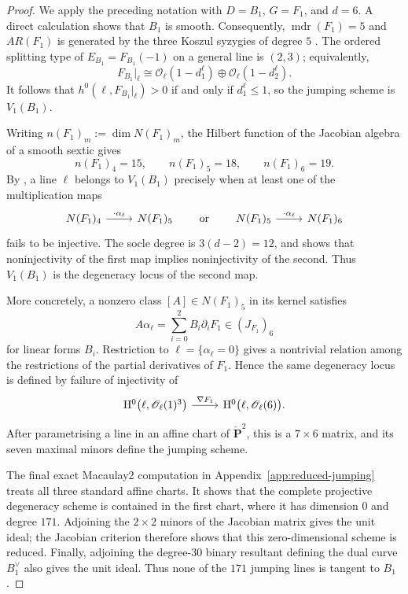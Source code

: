\documentclass[a4paper,12pt,twoside,reqno]{amsart}
\numberwithin{equation}{section}
\theoremstyle{plain}
\theoremstyle{definition}
\newcommand{\PP}{\mathbf{P}}
\newcommand{\Pdual}{\check{\PP}^2}
\newcommand{\HH}{\mathrm{H}}
\newcommand{\OO}{\mathscr{O}}
\theoremstyle{plain}
\theoremstyle{definition}
\begin{document}
\begin{proof}
We apply the preceding notation with $D=B_1$, $G=F_1$, and $d=6$.
A direct calculation shows that $B_1$ is smooth.  Consequently,
$\operatorname{mdr}(F_1)=5$ and $AR(F_1)$ is generated by the three Koszul
syzygies of degree $5$ \cite[Example~6.1]{DS}.  The ordered splitting type of
$E_{B_1}=F_{B_1}(-1)$ on a general line is $(2,3)$; equivalently,
\[
   F_{B_1}|_\ell
   \cong\OO_\ell(1-d_1^\ell)\oplus\OO_\ell(1-d_2^\ell).
\]
It follows that $h^0(\ell,F_{B_1}|_\ell)>0$ if and only if
$d_1^\ell\le1$, so the jumping scheme is $V_1(B_1)$.

Writing $n(F_1)_m:=\dim N(F_1)_m$, the Hilbert function of the Jacobian
algebra of a smooth sextic gives
\[
   n(F_1)_4=15,\qquad n(F_1)_5=18,\qquad n(F_1)_6=19.
\]
By \cite[Proposition~4.1]{DS}, a line $\ell$ belongs to $V_1(B_1)$ precisely
when at least one of the multiplication maps
\[
\begin{tikzcd}
N(F_1)_4 \arrow[r, "\cdot\alpha_\ell"] & N(F_1)_5
\end{tikzcd}
\qquad\text{or}\qquad
\begin{tikzcd}
N(F_1)_5 \arrow[r, "\cdot\alpha_\ell"] & N(F_1)_6
\end{tikzcd}
\]
fails to be injective.  The socle degree is $3(d-2)=12$, and
\cite[Remark~4.3]{DS} shows that noninjectivity of the first map implies
noninjectivity of the second.  Thus $V_1(B_1)$ is the degeneracy locus of
the second map.

More concretely, a nonzero class $[A]\in N(F_1)_5$ in its kernel satisfies
\[
   A\alpha_\ell=\sum_{i=0}^2 B_i\partial_iF_1\in(J_{F_1})_6
\]
for linear forms $B_i$.  Restriction to
$\ell=\{\alpha_\ell=0\}$ gives a nontrivial relation among the restrictions
of the partial derivatives of $F_1$.  Hence the same degeneracy locus is
defined by failure of injectivity of
\[
\begin{tikzcd}
\HH^0\bigl(\ell,\OO_\ell(1)^3\bigr)
\arrow[r, "\nabla F_1"]
& \HH^0\bigl(\ell,\OO_\ell(6)\bigr).
\end{tikzcd}
\]
After parametrising a line in an affine chart of $\Pdual$, this is a
$7\times6$ matrix, and its seven maximal minors define the jumping scheme.

The final exact Macaulay2 computation in
Appendix~\ref{app:reduced-jumping} treats all three standard affine charts.
It shows that the complete projective degeneracy scheme is contained in the
first chart, where it has dimension $0$ and degree $171$.  Adjoining the
$2\times2$ minors of the Jacobian matrix gives the unit ideal; the Jacobian
criterion therefore shows that this zero-dimensional scheme is reduced.
Finally, adjoining the degree-$30$ binary resultant defining the dual curve
$B_1^\vee$ also gives the unit ideal.  Thus none of the $171$ jumping lines
is tangent to $B_1$.
\end{proof}
\end{document}
